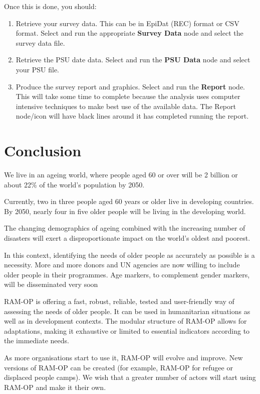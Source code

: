 \documentclass[12pt,]{book}
\theoremstyle{definition}
\theoremstyle{definition}
\theoremstyle{definition}
\theoremstyle{remark}
\begin{document}
Once this is done, you should:

\begin{enumerate}
\def\labelenumi{\arabic{enumi}.}
\item
  Retrieve your survey data. This can be in EpiDat (REC) format or CSV
  format. Select and run the appropriate \textbf{Survey Data} node and
  select the survey data file.
\item
  Retrieve the PSU date data. Select and run the \textbf{PSU Data} node
  and select your PSU file.
\item
  Produce the survey report and graphics. Select and run the
  \textbf{Report} node. This will take some time to complete because the
  analysis uses computer intensive techniques to make best use of the
  available data. The Report node/icon will have black lines around it
  has completed running the report.
\end{enumerate}

\hypertarget{conclusion}{%
\chapter{Conclusion}\label{conclusion}}

We live in an ageing world, where people aged 60 or over will be 2
billion or about 22\% of the world's population by 2050.

Currently, two in three people aged 60 years or older live in developing
countries. By 2050, nearly four in five older people will be living in
the developing world.

The changing demographics of ageing combined with the increasing number
of disasters will exert a disproportionate impact on the world's oldest
and poorest.

In this context, identifying the needs of older people as accurately as
possible is a necessity. More and more donors and UN agencies are now
willing to include older people in their programmes. Age markers, to
complement gender markers, will be disseminated very soon

RAM-OP is offering a fast, robust, reliable, tested and user-friendly
way of assessing the needs of older people. It can be used in
humanitarian situations as well as in development contexts. The modular
structure of RAM-OP allows for adaptations, making it exhaustive or
limited to essential indicators according to the immediate needs.

As more organisations start to use it, RAM-OP will evolve and improve.
New versions of RAM-OP can be created (for example, RAM-OP for refugee
or displaced people camps). We wish that a greater number of actors will
start using RAM-OP and make it their own.


\end{document}
